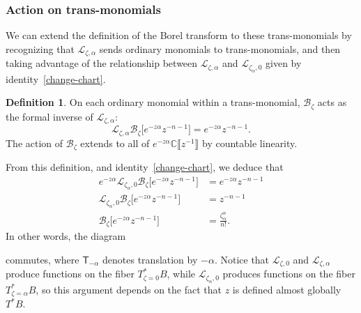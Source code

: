 \documentclass{article}
\newcommand{\C}{\mathbb{C}}
\newcommand{\laplace}{\mathcal{L}}
\newcommand{\borel}{\mathcal{B}}
\theoremstyle{definition}
\newtheorem{definition}{Definition}[section]
\theoremstyle{plain}
\begin{document}
\subsubsection{Action on trans-monomials}\label{sec:action_transseries}
%
We can extend the definition of the Borel transform to these trans-monomials by recognizing that $\laplace_{\zeta, \alpha}$ sends ordinary monomials to trans-monomials, and then taking advantage of the relationship between $\laplace_{\zeta, \alpha}$ and $\laplace_{\zeta_\alpha, 0}$ given by identity~\eqref{change-chart}.
\begin{definition}
On each ordinary monomial within a trans-monomial, $\borel_\zeta$ acts as the formal inverse of $\laplace_{\zeta,\alpha}$:
\[\laplace_{\zeta,\alpha}\borel_\zeta\big[e^{-z\alpha} z^{-n-1} \big]=e^{-z\alpha} z^{-n-1}. \]
The action of $\borel_\zeta$ extends to all of $e^{-z\alpha} \C\llbracket z^{-1} \rrbracket$ by countable linearity.
\end{definition}
From this definition, and identity~\eqref{change-chart}, we deduce that
\begin{align*}
e^{-z\alpha}\laplace_{\zeta_\alpha,0}\borel_\zeta\big[e^{-z\alpha} z^{-n-1}\big] & = e^{-z\alpha} z^{-n-1} \\
\laplace_{\zeta_\alpha,0}\borel_\zeta\big[e^{-z\alpha} z^{-n-1}\big] & = z^{-n-1} \\
\borel_{\zeta}\big[e^{-z\alpha}z^{-n-1}\big] & = \frac{\zeta_\alpha^n}{n!}.
\end{align*}
In other words, the diagram 
\begin{center}
\end{center}
commutes, where $\mathsf{T}_{-\alpha}$ denotes translation by $-\alpha$. Notice that $\laplace_{\zeta, 0}$ and $\laplace_{\zeta, \alpha}$ produce functions on the fiber $T^*_{\zeta = 0}B$, while $\laplace_{\zeta_\alpha, 0}$ produces functions on the fiber $T^*_{\zeta = \alpha}B$, so this argument depends on the fact that $z$ is defined almost globally $T^*B$.
\end{document}
